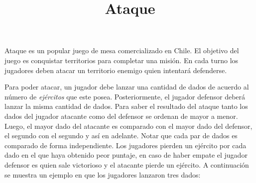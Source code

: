 \documentclass{oci}
\title{Ataque}
\begin{document}
\begin{problemDescription}
  Ataque es un popular juego de mesa comercializado en Chile.
  El objetivo del juego es conquistar territorios para completar una misión.
  En cada turno los jugadores deben atacar un territorio enemigo quien
  intentará defenderse.

  Para poder atacar, un jugador debe lanzar una cantidad de dados de acuerdo al
  número de \emph{ejércitos} que este posea.
  Posteriormente, el jugador defensor deberá lanzar la misma cantidad de dados.
  Para saber el resultado del ataque tanto los dados del jugador atacante como
  del defensor se ordenan de mayor a menor.
  Luego, el mayor dado del atacante es comparado con el mayor dado del defensor,
  el segundo con el segundo y así en adelante.
  Notar que cada par de dados es comparado de forma independiente.
  Los jugadores pierden un ejército por cada dado en el que haya obtenido peor
  puntaje, en caso de haber empate el jugador defensor es quien sale victorioso
  y el atacante pierde un ejército.
  A continuación se muestra un ejemplo en que los jugadores lanzaron tres dados:

\begin{center}
\end{center}
\end{problemDescription}
\end{document}
